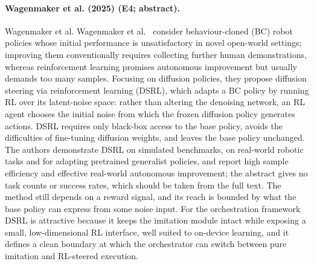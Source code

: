 \documentclass[10pt,a4paper]{article}
\begin{document}
\paragraph{Wagenmaker et al. (2025) (E4; abstract).} Wagenmaker et al. Wagenmaker et al.~\cite{Wagenmaker2025} consider behaviour-cloned (BC) robot policies whose initial performance is unsatisfactory in novel open-world settings; improving them conventionally requires collecting further human demonstrations, whereas reinforcement learning promises autonomous improvement but usually demands too many samples. Focusing on diffusion policies, they propose diffusion steering via reinforcement learning (DSRL), which adapts a BC policy by running RL over its latent-noise space: rather than altering the denoising network, an RL agent chooses the initial noise from which the frozen diffusion policy generates actions. DSRL requires only black-box access to the base policy, avoids the difficulties of fine-tuning diffusion weights, and leaves the base policy unchanged. The authors demonstrate DSRL on simulated benchmarks, on real-world robotic tasks and for adapting pretrained generalist policies, and report high sample efficiency and effective real-world autonomous improvement; the abstract gives no task counts or success rates, which should be taken from the full text. The method still depends on a reward signal, and its reach is bounded by what the base policy can express from some noise input. For the orchestration framework DSRL is attractive because it keeps the imitation module intact while exposing a small, low-dimensional RL interface, well suited to on-device learning, and it defines a clean boundary at which the orchestrator can switch between pure imitation and RL-steered execution.
\end{document}
